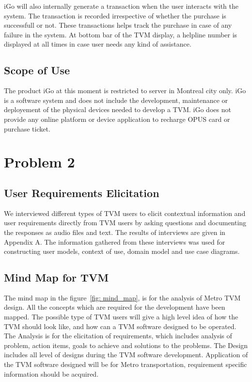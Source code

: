 \documentclass[a4paper,12pt]{report}
\begin{document}
iGo will also internally generate a \gls{transaction} when the user interacts with the system. The transaction is recorded irrespective of whether the purchase is successfull or not. These transactions helps track the purchase in case of any failure in the system. At bottom bar of the TVM display, a helpline number is displayed at all times in case user needs any kind of assistance.

\subsection{Scope of Use}
The product iGo at this moment is restricted to server in Montreal city only. iGo is a software system and does not include the development, maintenance or deployement of the physical devices needed to develop a TVM. iGo does not provide any online platform or device application to recharge OPUS card or purchase ticket.



%
%

\newpage
\section{Problem 2}

\subsection{User Requirements Elicitation}
We interviewed different types of TVM users to elicit contextual information and user requirements directly from TVM users by asking questions and documenting the responses as audio files and text. The results of interviews are given in Appendix A. The information gathered from these interviews was used for constructing user models, context of use\cite{contextofusecasekamthan}, domain model\cite{domainkamthan} and use case diagrams\cite{usecasekamthan}.

\vspace{1cm}

\subsection{Mind Map for TVM}
The mind map\cite{mindmapkamthan} in the figure~\ref{fig: mind_map}, is for the analysis of Metro TVM design. All the concepts which are required for the development have been mapped. The possible type of TVM users will give a high level idea of how the TVM should look like, and how can a TVM software designed to be operated. The Analysis is for the elicitation of requirements, which includes analysis of problem, action items, goals to achieve and solutions to the problems. The Design includes all level of designs during the TVM software development. Application of the TVM software designed will be for Metro transportation, requirement specific information should be acquired.
\end{document}
